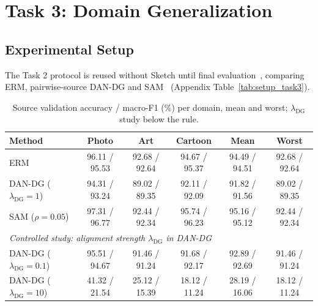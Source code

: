 \section{Task 3: Domain Generalization}

\subsection{Experimental Setup}
The Task 2 protocol is reused without Sketch until final evaluation~\citep{gulrajani2021search}, comparing ERM, pairwise-source DAN-DG and SAM~\citep{foret2021sam} (Appendix Table~\ref{tab:setup_task3}).

\begin{table}[htbp]
  \caption{Source validation accuracy / macro-F1 (\%) per domain, mean and worst; $\lambda_{\mathrm{DG}}$ study below the rule.}
  \label{tab:task3_source}
  \centering
  \small
  \setlength{\tabcolsep}{3pt}
  \begin{tabular}{lccccc}
    \toprule
    \textbf{Method} & Photo & Art & Cartoon & Mean & Worst \\
    \midrule
    ERM                                & 96.11 / 95.53 & 92.68 / 92.64 & 94.67 / 95.37 & 94.49 / 94.51 & 92.68 / 92.64 \\
    DAN-DG ($\lambda_{\mathrm{DG}}=1$) & 94.31 / 93.24 & 89.02 / 89.35 & 92.11 / 92.09 & 91.82 / 91.56 & 89.02 / 89.35 \\
    SAM ($\rho=0.05$)                  & 97.31 / 96.77 & 92.44 / 92.34 & 95.74 / 96.23 & 95.16 / 95.12 & 92.44 / 92.34 \\
    \midrule
    \multicolumn{6}{l}{\textit{Controlled study: alignment strength $\lambda_{\mathrm{DG}}$ in DAN-DG}} \\
    DAN-DG ($\lambda_{\mathrm{DG}}=0.1$) & 95.51 / 94.67 & 91.46 / 91.24 & 91.68 / 92.17 & 92.89 / 92.69 & 91.46 / 91.24 \\
    DAN-DG ($\lambda_{\mathrm{DG}}=10$)  & 41.32 / 21.54 & 25.12 / 15.39 & 18.12 / 11.24 & 28.19 / 16.06 & 18.12 / 11.24 \\
    \bottomrule
  \end{tabular}
\end{table}


